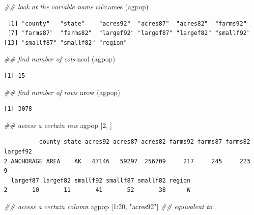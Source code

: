 \documentclass[
  letterpaper,
]{scrbook}
\newenvironment{Shaded}{\begin{snugshade}}{\end{snugshade}}
\newcommand{\DecValTok}[1]{\textcolor[rgb]{0.68,0.00,0.00}{#1}}
\newcommand{\DocumentationTok}[1]{\textcolor[rgb]{0.37,0.37,0.37}{\textit{#1}}}
\newcommand{\FunctionTok}[1]{\textcolor[rgb]{0.28,0.35,0.67}{#1}}
\newcommand{\NormalTok}[1]{\textcolor[rgb]{0.00,0.23,0.31}{#1}}
\newcommand{\SpecialCharTok}[1]{\textcolor[rgb]{0.37,0.37,0.37}{#1}}
\newcommand{\StringTok}[1]{\textcolor[rgb]{0.13,0.47,0.30}{#1}}
\begin{document}
\begin{Shaded}
\begin{Highlighting}[]
\DocumentationTok{\#\# look at the variable name}
\FunctionTok{colnames}\NormalTok{ (agpop) }
\end{Highlighting}
\end{Shaded}

\begin{verbatim}
 [1] "county"   "state"    "acres92"  "acres87"  "acres82"  "farms92" 
 [7] "farms87"  "farms82"  "largef92" "largef87" "largef82" "smallf92"
[13] "smallf87" "smallf82" "region"  
\end{verbatim}

\begin{Shaded}
\begin{Highlighting}[]
\DocumentationTok{\#\# find number of cols}
\FunctionTok{ncol}\NormalTok{ (agpop) }
\end{Highlighting}
\end{Shaded}

\begin{verbatim}
[1] 15
\end{verbatim}

\begin{Shaded}
\begin{Highlighting}[]
\DocumentationTok{\#\# find number of rows}
\FunctionTok{nrow}\NormalTok{ (agpop) }
\end{Highlighting}
\end{Shaded}

\begin{verbatim}
[1] 3078
\end{verbatim}

\begin{Shaded}
\begin{Highlighting}[]
\DocumentationTok{\#\# access a certain row }
\NormalTok{agpop [}\DecValTok{2}\NormalTok{, ]}
\end{Highlighting}
\end{Shaded}

\begin{verbatim}
          county state acres92 acres87 acres82 farms92 farms87 farms82 largef92
2 ANCHORAGE AREA    AK   47146   59297  256709     217     245     223        9
  largef87 largef82 smallf92 smallf87 smallf82 region
2       10       11       41       52       38      W
\end{verbatim}

\begin{Shaded}
\begin{Highlighting}[]
\DocumentationTok{\#\# access a certain column}
\NormalTok{agpop [}\DecValTok{1}\SpecialCharTok{:}\DecValTok{20}\NormalTok{, }\StringTok{"acres92"}\NormalTok{] }\DocumentationTok{\#\# equivalent to }
\end{Highlighting}
\end{Shaded}
\end{document}
